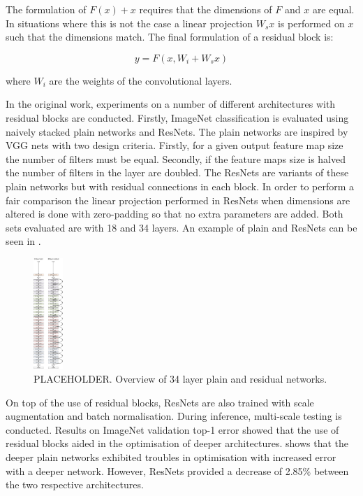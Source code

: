 The formulation of $F(x) + x$ requires that the dimensions of $F$ and $x$ are equal. In situations where this is not the case a linear projection $W_sx$ is performed on $x$ such that the dimensions match. The final formulation of a residual block is:

\begin{equation}
	y = F(x, {W_i} + W_sx)
\end{equation}

where $W_i$ are the weights of the convolutional layers.

In the original work, experiments on a number of different architectures with residual blocks are conducted. Firstly, ImageNet classification is evaluated using naively stacked plain networks and ResNets. The plain networks are inspired by VGG nets \cite{vgg16} with two design criteria. Firstly, for a given output feature map size the number of filters must be equal. Secondly, if the feature maps size is halved the number of filters in the layer are doubled. The ResNets are variants of these plain networks but with residual connections in each block. In order to perform a fair comparison the linear projection performed in ResNets when dimensions are altered is done with zero-padding so that no extra parameters are added. Both sets evaluated are with 18 and 34 layers. An example of plain and ResNets can be seen in .

\begin{figure}[H]
  \centering
    \includegraphics[width=0.1\textwidth]{Figs/Techanal/plainres.png}
    \caption{PLACEHOLDER. Overview of 34 layer plain and residual networks.}
    \label{fig:plainres}
\end{figure}

On top of the use of residual blocks, ResNets are also trained with scale augmentation and batch normalisation. During inference, multi-scale testing is conducted. Results on ImageNet validation top-1 error showed that the use of residual blocks aided in the optimisation of deeper architectures.  shows that the deeper plain networks exhibited troubles in optimisation with increased error with a deeper network. However, ResNets provided a decrease of 2.85\% between the two respective architectures.

